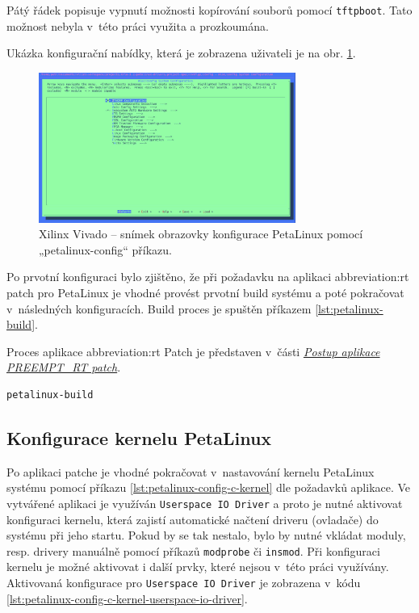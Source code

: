\documentclass[a4paper, twoside, 11pt]{article}
\begin{document}
	Pátý řádek popisuje vypnutí možnosti kopírování souborů pomocí \texttt{tftpboot}. Tato možnost nebyla v~této práci využita a prozkoumána.\par
	Ukázka konfigurační nabídky, která je zobrazena uživateli je na obr. \ref{fig:terminal-petalinux-config}.\par

\begin{figure}[htbp!]
	\centering
	\includegraphics[width=0.75\textwidth]{src/jpg/terminal-petalinux-config.jpg}
	\caption{Xilinx Vivado – snímek obrazovky konfigurace PetaLinux pomocí „petalinux-config“ příkazu.}
	\label{fig:terminal-petalinux-config}
\end{figure}


	Po prvotní konfiguraci bylo zjištěno, že při požadavku na aplikaci \gls{abbreviation:rt} patch pro PetaLinux je vhodné provést prvotní build systému a poté pokračovat v~následných konfiguracích. Build proces je spuštěn příkazem \ref{lst:petalinux-build}.\par
	Proces aplikace \gls{abbreviation:rt} Patch je představen v~části \hyperref[subsubsec:postup-aplikace-preempt-rt-patch]{\textit{Postup aplikace PREEMPT\_RT patch}}.\par

\begin{lstlisting}[language={sh}, caption={PetaLinux build příkaz pro vytvoření systému.}, label= {lst:petalinux-build}, morekeywords={petalinux-build, petalinux-package, petalinux-config}]
petalinux-build\end{lstlisting}

	\subsection{Konfigurace kernelu PetaLinux}
	Po aplikaci patche je vhodné pokračovat v~nastavování kernelu PetaLinux systému pomocí příkazu \ref{lst:petalinux-config-c-kernel}  dle požadavků aplikace. Ve vytvářené aplikaci je využíván \texttt{Userspace IO Driver} a proto je nutné aktivovat konfiguraci kernelu, která zajistí automatické načtení driveru (ovladače) do systému při jeho startu. Pokud by se tak nestalo, bylo by nutné vkládat moduly, resp. drivery manuálně pomocí příkazů \texttt{modprobe} či \texttt{insmod}. Při konfiguraci kernelu je možné aktivovat i další prvky, které nejsou v~této práci využívány. Aktivovaná konfigurace pro \texttt{Userspace IO Driver} je zobrazena v~kódu \ref{lst:petalinux-config-c-kernel-userspace-io-driver}.\par
\end{document}
